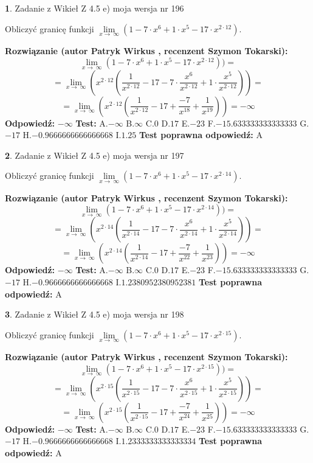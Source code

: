 \documentclass[12pt, a4paper]{article}
\theoremstyle{definition} %
\newtheorem{zad}{}
\newcommand{\zadStart}[1]{\begin{zad}#1\newline}
\newcommand{\zadStop}{\end{zad}}
\newcommand{\rozwStart}[2]{\noindent \textbf{Rozwiązanie (autor #1 , recenzent #2): }\newline}
\newcommand{\rozwStop}{\newline}
\newcommand{\odpStart}{\noindent \textbf{Odpowiedź:}\newline}
\newcommand{\odpStop}{\newline}
\newcommand{\testStart}{\noindent \textbf{Test:}\newline}
\newcommand{\testStop}{\newline}
\newcommand{\kluczStart}{\noindent \textbf{Test poprawna odpowiedź:}\newline}
\newcommand{\kluczStop}{\newline}
\begin{document}
\zadStart{Zadanie z Wikieł Z 4.5 e) moja wersja nr 196}


Obliczyć granicę funkcji  $\lim\limits_{x\to\ \infty}(1 - 7 \cdot x^{6}+1 \cdot x^{5}- 17 \cdot x^{2\cdot12})$.
\zadStop
\rozwStart{Patryk Wirkus}{Szymon Tokarski}
$$\lim\limits_{x\to\ \infty}(1 - 7 \cdot x^{6}+1 \cdot x^{5}- 17 \cdot x^{2\cdot12}))=$$
$$=\lim\limits_{x\to\ \infty}(x^{2\cdot12}(\frac{1}{x^{2\cdot12}}-17 -7 \cdot \frac{x^{6}}{x^{2\cdot12}}+1 \cdot \frac{x^{5}}{x^{2\cdot12}}))=$$
$$=\lim\limits_{x\to\ \infty}(x^{2\cdot12}(\frac{1}{x^{2\cdot12}}-17 + \frac{-7}{x^{18}}+ \frac{1}{x^{19}}))=-\infty$$
\rozwStop
\odpStart
$-\infty$
\odpStop
\testStart
A.$-\infty$ B.$\infty$ C.$0$ D.$17$ E.$-23$
F.$-15.633333333333333$ G.$-17$
H.$-0.9666666666666668$
I.$1.25$
\testStop
\kluczStart
A
\kluczStop



\zadStart{Zadanie z Wikieł Z 4.5 e) moja wersja nr 197}


Obliczyć granicę funkcji  $\lim\limits_{x\to\ \infty}(1 - 7 \cdot x^{6}+1 \cdot x^{5}- 17 \cdot x^{2\cdot14})$.
\zadStop
\rozwStart{Patryk Wirkus}{Szymon Tokarski}
$$\lim\limits_{x\to\ \infty}(1 - 7 \cdot x^{6}+1 \cdot x^{5}- 17 \cdot x^{2\cdot14}))=$$
$$=\lim\limits_{x\to\ \infty}(x^{2\cdot14}(\frac{1}{x^{2\cdot14}}-17 -7 \cdot \frac{x^{6}}{x^{2\cdot14}}+1 \cdot \frac{x^{5}}{x^{2\cdot14}}))=$$
$$=\lim\limits_{x\to\ \infty}(x^{2\cdot14}(\frac{1}{x^{2\cdot14}}-17 + \frac{-7}{x^{22}}+ \frac{1}{x^{23}}))=-\infty$$
\rozwStop
\odpStart
$-\infty$
\odpStop
\testStart
A.$-\infty$ B.$\infty$ C.$0$ D.$17$ E.$-23$
F.$-15.633333333333333$ G.$-17$
H.$-0.9666666666666668$
I.$1.2380952380952381$
\testStop
\kluczStart
A
\kluczStop



\zadStart{Zadanie z Wikieł Z 4.5 e) moja wersja nr 198}


Obliczyć granicę funkcji  $\lim\limits_{x\to\ \infty}(1 - 7 \cdot x^{6}+1 \cdot x^{5}- 17 \cdot x^{2\cdot15})$.
\zadStop
\rozwStart{Patryk Wirkus}{Szymon Tokarski}
$$\lim\limits_{x\to\ \infty}(1 - 7 \cdot x^{6}+1 \cdot x^{5}- 17 \cdot x^{2\cdot15}))=$$
$$=\lim\limits_{x\to\ \infty}(x^{2\cdot15}(\frac{1}{x^{2\cdot15}}-17 -7 \cdot \frac{x^{6}}{x^{2\cdot15}}+1 \cdot \frac{x^{5}}{x^{2\cdot15}}))=$$
$$=\lim\limits_{x\to\ \infty}(x^{2\cdot15}(\frac{1}{x^{2\cdot15}}-17 + \frac{-7}{x^{24}}+ \frac{1}{x^{25}}))=-\infty$$
\rozwStop
\odpStart
$-\infty$
\odpStop
\testStart
A.$-\infty$ B.$\infty$ C.$0$ D.$17$ E.$-23$
F.$-15.633333333333333$ G.$-17$
H.$-0.9666666666666668$
I.$1.2333333333333334$
\testStop
\kluczStart
A
\kluczStop
\end{document}
